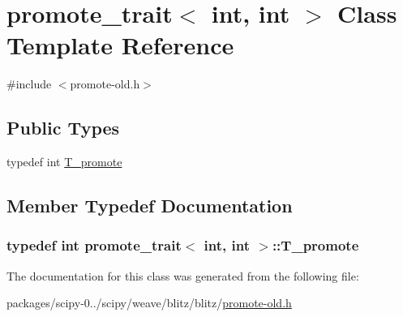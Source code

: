 \hypertarget{classpromote__trait_3_01int_00_01int_01_4}{}\section{promote\+\_\+trait$<$ int, int $>$ Class Template Reference}
\label{classpromote__trait_3_01int_00_01int_01_4}


{\ttfamily \#include $<$promote-\/old.\+h$>$}

\subsection*{Public Types}
\begin{DoxyCompactItemize}
\item 
typedef int \hyperlink{classpromote__trait_3_01int_00_01int_01_4_a5219a1912b160a51c78bd8fe87733689}{T\+\_\+promote}
\end{DoxyCompactItemize}


\subsection{Member Typedef Documentation}
\hypertarget{classpromote__trait_3_01int_00_01int_01_4_a5219a1912b160a51c78bd8fe87733689}{}
\subsubsection[{T\+\_\+promote}]{\setlength{\rightskip}{0pt plus 5cm}typedef int {\bf promote\+\_\+trait}$<$ int, int $>$\+::{\bf T\+\_\+promote}}\label{classpromote__trait_3_01int_00_01int_01_4_a5219a1912b160a51c78bd8fe87733689}


The documentation for this class was generated from the following file\+:\begin{DoxyCompactItemize}
\item 
packages/scipy-\/0../scipy/weave/blitz/blitz/\hyperlink{promote-old_8h}{promote-\/old.\+h}\end{DoxyCompactItemize}
